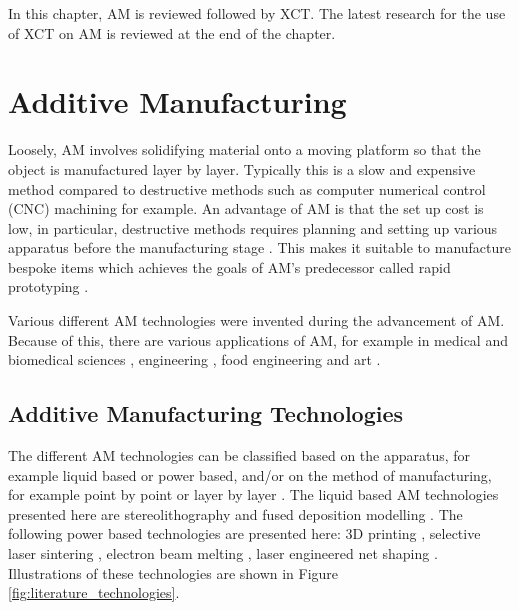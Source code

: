 In this chapter, AM is reviewed followed by XCT. The latest research for the use of XCT on AM is reviewed at the end of the chapter.

\section{Additive Manufacturing}

Loosely, AM involves solidifying material onto a moving platform so that the object is manufactured layer by layer. Typically this is a slow and expensive method compared to destructive methods such as computer numerical control (CNC) machining for example. An advantage of AM is that the set up cost is low, in particular, destructive methods requires planning and setting up various apparatus before the manufacturing stage \citep{gibson2010additive}. This makes it suitable to manufacture bespoke items which achieves the goals of AM's predecessor called rapid prototyping \citep{kruth1991material}.

Various different AM technologies were invented during the advancement of AM. Because of this, there are various applications of AM, for example in medical and biomedical sciences \citep{kang20163d, kourra2018computed}, engineering \citep{cooper2015design}, food engineering \citep{godoi20163d} and art \citep{ornes2013mathematics, grossman2019bathsheba}.

\subsection{Additive Manufacturing Technologies}

The different AM technologies can be classified based on the apparatus, for example liquid based or power based, and/or on the method of manufacturing, for example point by point or layer by layer \citep{kruth1991material}. The liquid based AM technologies presented here are stereolithography \citep{kodama1981automatic, hull1986apparatus, 3d2019our} and fused deposition modelling \citep{crump1991fused, crump1992apparatus, stratasys2019what}. The following power based technologies are presented here: 3D printing \citep{sachs1990three}, selective laser sintering \citep{deckard1989method, dtm1990the, 3d2019our}, electron beam melting \citep{larsson2004arrangement, arcam2019history}, laser engineered net shaping \citep{atwood1998laser}. Illustrations of these technologies are shown in Figure \ref{fig:literature_technologies}.

